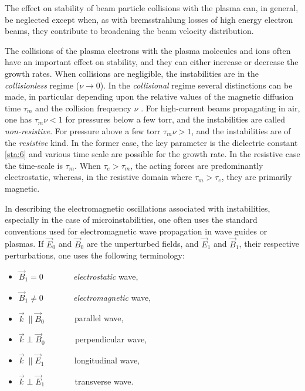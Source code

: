 \documentclass [12pt,a4paper,     ]{report} %
\newcommand{\tr}{\pmb{\perp}}         %
\newcommand{\lo}{\pmb{\parallel}}     %
\begin{document}
	The effect on stability of beam particle collisions with the plasma can, in general, be neglected except when, as with bremsstrahlung losses of high energy electron beams, they contribute to broadening the beam velocity distribution.

	The collisions of the plasma electrons with the plasma molecules and ions often have an important effect on stability, and they can either increase or decrease the growth rates.   When collisions are negligible, the instabilities are in the \emph{collisionless} regime ($\nu \rightarrow 0$).  In the \emph{collisional} regime several distinctions can be made, in particular depending upon the relative values  of the magnetic diffusion time $\tau_m$  and the collision frequency $\nu$ \cite{BENFO1973-}.  For high-current beams propagating in air, one has $\tau_m \nu < 1$ for pressures below a few torr, and the instabilities are called \emph{non-resistive}.  For pressure above a few torr $\tau_m \nu > 1$, and the instabilities are of the \emph{resistive} kind.  In the former case, the key parameter is the dielectric constant \eqref{sta:6} and various time scale are possible for the growth rate.  In the resistive case the time-scale is $\tau_m$.  When $\tau_e > \tau_m$, the acting forces are predominantly electrostatic, whereas, in the resistive domain where $\tau_m > \tau_e$, they are primarily magnetic.

	In describing the electromagnetic oscillations associated with instabilities, especially in the case of microinstabilities, one often uses the standard conventions used for electromagnetic wave propagation in wave guides or plasmas.  If $\vec{E}_0$ and $\vec{B}_0$ are the unperturbed fields, and $\vec{E}_1$ and $\vec{B}_1$, their respective perturbations, one uses the following terminology:

\begin{itemize}
\item	$\vec{B}_1    = 0$	~~~~~~ \emph{electrostatic} wave,
\item	$\vec{B}_1 \neq 0$	~~~~~~ \emph{electromagnetic} wave,
\item	$\vec{k}~ \lo \vec{B}_0$	~~~~~~ parallel wave,
\item	$\vec{k} \tr \vec{B}_0$	~~~~~~ perpendicular wave,
\item	$\vec{k}~ \lo \vec{E}_1$	~~~~~~ longitudinal wave,
\item	$\vec{k} \tr \vec{E}_1$	~~~~~~ transverse wave.
\end{itemize}
\end{document}
